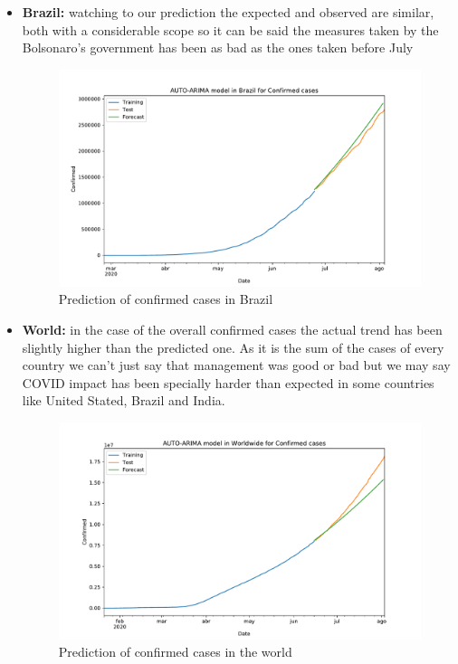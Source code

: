 \documentclass[lang=english,inputenc=utf8,fontsize=10pt]{ldvarticle}
\begin{document}
\begin{itemize}
    \item
    \textbf{Brazil:} watching to our prediction the expected and observed are similar, both with a considerable scope so it can be said the measures taken by the Bolsonaro's government has been as bad as the ones taken before July\cite{bbc_2020}
    \begin{figure}[H]
        \centering
        \includegraphics[scale=0.4]{plots/Brazil_Confirmed_prediction.pdf}
        \caption{Prediction of confirmed cases in Brazil}
    \end{figure}
    
    \item
    \textbf{World:} in the case of the overall confirmed cases the actual trend has been slightly higher than the predicted one. As it is the sum of the cases of every country we can't just say that management was good or bad but we may say COVID impact has been specially harder than expected in some countries like United Stated, Brazil and India\cite{theGuardian_2020}.
    \begin{figure}[H]
        \centering
        \includegraphics[scale=0.4]{plots/Worldwide_Confirmed_prediction.pdf}
        \caption{Prediction of confirmed cases in the world}
    \end{figure}
    
\end{itemize}
\end{document}
